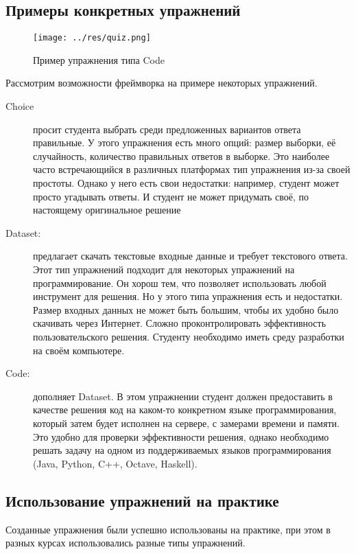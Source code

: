 \documentclass{matmex-diploma-custom}
\begin{document}
\subsection{Примеры конкретных упражнений}
\begin{figure}
  \texttt{[image: ../res/quiz.png]}
  \caption{Пример упражнения типа Code}
\end{figure}

Рассмотрим возможности фреймворка на примере некоторых упражнений.

\begin{description}
\item[Choice] просит студента выбрать среди предложенных вариантов
  ответа правильные. У этого упражнения есть много опций: размер
  выборки, её случайность, количество правильных ответов в
  выборке. Это наиболее часто встречающийся в различных платформах тип
  упражнения из-за своей простоты. Однако у него есть свои недостатки:
  например, студент может просто угадывать ответы. И студент не может
  придумать своё, по настоящему оригинальное решение

\item[Dataset:] предлагает скачать текстовые входные данные и требует
  текстового ответа. Этот тип упражнений подходит для некоторых
  упражнений на программирование. Он хорош тем, что позволяет
  использовать любой инструмент для решения. Но у этого типа
  упражнения есть и недостатки. Размер входных данных не может быть
  большим, чтобы их удобно было скачивать через Интернет. Сложно
  проконтролировать эффективность пользовательского решения. Студенту
  необходимо иметь среду разработки на своём компьютере.

\item[Code:] дополняет Dataset. В этом упражнении студент должен
  предоставить в качестве решения код на каком-то конкретном языке
  программирования, который затем будет исполнен на сервере, с
  замерами времени и памяти. Это удобно для проверки эффективности
  решения, однако необходимо решать задачу на одном из поддерживаемых
  языков программирования (Java, Python, C++, Octave, Haskell).

\end{description}

\subsection{Использование упражнений на практике}

Созданные упражнения были успешно использованы на практике, при этом в
разных курсах использовались разные типы упражнений.
\end{document}
